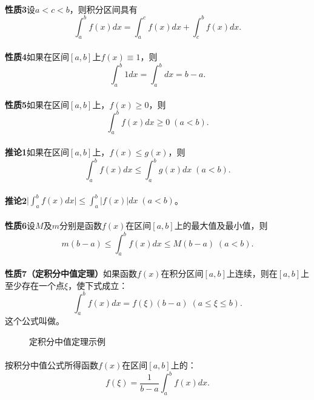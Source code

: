 \paragraph{}
\textbf{性质3\;}设$a<c<b$，则积分区间具有
\begin{equation}
  \int_a^bf(x)dx = \int_a^cf(x)dx + \int_c^bf(x)dx.
\end{equation}

\paragraph{}
\textbf{性质4\;}如果在区间$[a,b]$上$f(x)\equiv 1$，则
\begin{equation}
  \int_a^b1dx = \int_a^bdx=b-a.
\end{equation}

\paragraph{}
\textbf{性质5\;}如果在区间$[a,b]$上，$f(x)\geq 0$，则
\begin{equation}
  \int_a^bf(x)dx \geq 0 \; (a<b).
\end{equation}

\paragraph{}
\textbf{推论1\;}如果在区间$[a,b]$上，$f(x)\leq g(x)$，则
\begin{equation}
  \int_a^bf(x)dx \leq \int_a^bg(x)dx \; (a<b).
\end{equation}

\paragraph{}
\textbf{推论2\;}$\displaystyle\big| \int_a^bf(x)dx \big| \leq \int_a^b|f(x)|dx \; (a<b)$。

\paragraph{}
\textbf{性质6\;}设$M$及$m$分别是函数$f(x)$在区间$[a,b]$上的最大值及最小值，则
\begin{equation}
  m(b-a) \leq \int_a^bf(x)dx \leq M(b-a) \; (a<b).
\end{equation}

\paragraph{}
\textbf{性质7（定积分中值定理）\;}如果函数$f(x)$在积分区间$[a,b]$上连续，则在$[a,b]$上至少存在一个点$\xi$，使下式成立：
\begin{equation}
  \int_a^bf(x)dx = f(\xi)(b-a) \; (a\leq\xi\leq b).
\end{equation}
这个公式叫做。

\begin{figure}[H]
\centering
  
  \caption{定积分中值定理示例}
  \label{定积分中值定理示例}
\end{figure}

\paragraph{}
按积分中值公式所得函数$f(x)$在区间$[a,b]$上的：
\begin{equation}
  f(\xi) = \frac{1}{b-a}\int_a^bf(x)dx.
\end{equation}
